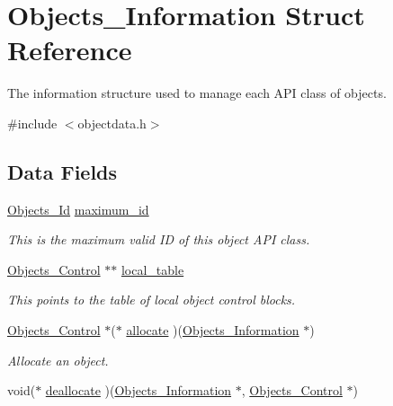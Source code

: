 \hypertarget{structObjects__Information}{}\section{Objects\+\_\+\+Information Struct Reference}
\label{structObjects__Information}


The information structure used to manage each A\+PI class of objects.  




{\ttfamily \#include $<$objectdata.\+h$>$}

\subsection*{Data Fields}
\begin{DoxyCompactItemize}
\item 
\mbox{\hyperlink{group__RTEMSScoreObject_ga5821f52a51072941bdd603e542d0863e}{Objects\+\_\+\+Id}} \mbox{\hyperlink{structObjects__Information_a4f4f5708f3462a8231a2d5061fde16ca}{maximum\+\_\+id}}
\begin{DoxyCompactList}\small\item\em This is the maximum valid ID of this object A\+PI class. \end{DoxyCompactList}\item 
\mbox{\hyperlink{structObjects__Control}{Objects\+\_\+\+Control}} $\ast$$\ast$ \mbox{\hyperlink{structObjects__Information_a50defdb521eb333efa15a2c3d88a8306}{local\+\_\+table}}
\begin{DoxyCompactList}\small\item\em This points to the table of local object control blocks. \end{DoxyCompactList}\item 
\mbox{\hyperlink{structObjects__Control}{Objects\+\_\+\+Control}} $\ast$($\ast$ \mbox{\hyperlink{structObjects__Information_a7af43991511d7dd62eb13de9542b96e2}{allocate}} )(\mbox{\hyperlink{structObjects__Information}{Objects\+\_\+\+Information}} $\ast$)
\begin{DoxyCompactList}\small\item\em Allocate an object. \end{DoxyCompactList}\item 
void($\ast$ \mbox{\hyperlink{structObjects__Information_a96ea4d5b8aed745245138190485220f6}{deallocate}} )(\mbox{\hyperlink{structObjects__Information}{Objects\+\_\+\+Information}} $\ast$, \mbox{\hyperlink{structObjects__Control}{Objects\+\_\+\+Control}} $\ast$)
$$
\end{DoxyCompactItemize}
